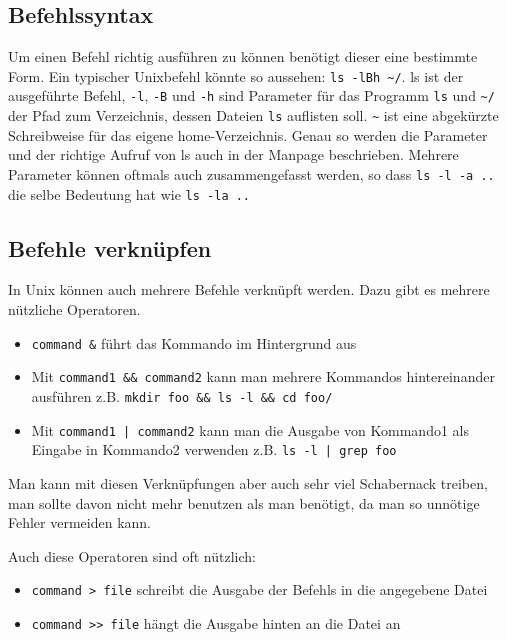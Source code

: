 \subsection{Befehlssyntax}
Um einen Befehl richtig ausführen zu können benötigt dieser eine bestimmte Form. Ein typischer Unixbefehl könnte so aussehen:
\lstinline$ls -lBh ~/$. ls ist der ausgeführte Befehl, \lstinline$-l$, \lstinline$-B$ und \lstinline$-h$ sind Parameter für das Programm \lstinline$ls$ und \lstinline$~/$ der Pfad zum Verzeichnis, dessen Dateien \lstinline$ls$ auflisten soll. \lstinline$~$ ist eine abgekürzte Schreibweise für das eigene home-Verzeichnis.
Genau so werden die Parameter und der richtige Aufruf von ls auch in der Manpage beschrieben. Mehrere Parameter können oftmals auch zusammengefasst werden, so dass \lstinline$ls -l -a ..$ die selbe Bedeutung hat wie \lstinline$ls -la ..$

\subsection{Befehle verknüpfen}
In Unix können auch mehrere Befehle verknüpft werden. Dazu gibt es mehrere nützliche Operatoren.
\begin{itemize}
\item \lstinline$command &$ führt das Kommando im Hintergrund aus
\item Mit \lstinline$command1 && command2$ kann man mehrere Kommandos hintereinander ausführen z.B. \lstinline$mkdir foo && ls -l && cd foo/$
\item Mit \lstinline$command1 | command2$ kann man die Ausgabe von Kommando1 als Eingabe in Kommando2 verwenden  z.B. \lstinline$ls -l | grep foo$
\end{itemize}

Man kann mit diesen Verknüpfungen aber auch sehr viel Schabernack treiben, man sollte davon nicht mehr benutzen als man benötigt, da man so unnötige Fehler vermeiden kann.

Auch diese Operatoren sind oft nützlich:
\begin{itemize}
\item \lstinline$command > file$ schreibt die Ausgabe der Befehls in die angegebene Datei
\item \lstinline$command >> file$ hängt die Ausgabe hinten an die Datei an
\end{itemize}


